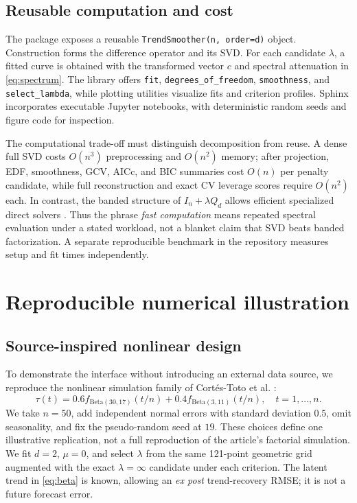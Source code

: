 \documentclass[pdflatex,sn-mathphys-ay]{sn-jnl}
\begin{document}


\subsection{Reusable computation and cost}
The package exposes a reusable \texttt{TrendSmoother(n, order=d)} object. Construction forms the difference operator and its SVD. For each candidate $\lambda$, a fitted curve is obtained with the transformed vector $c$ and spectral attenuation in \eqref{eq:spectrum}. The library offers \texttt{fit}, \texttt{degrees\_of\_freedom}, \texttt{smoothness}, and \texttt{select\_lambda}, while plotting utilities visualize fits and criterion profiles. Sphinx incorporates executable Jupyter notebooks, with deterministic random seeds and figure code for inspection.

The computational trade-off must distinguish decomposition from reuse. A dense full SVD costs $O(n^3)$ preprocessing and $O(n^2)$ memory; after projection, EDF, smoothness, GCV, AICc, and BIC summaries cost $O(n)$ per penalty candidate, while full reconstruction and exact CV leverage scores require $O(n^2)$ each. In contrast, the banded structure of $I_n+\lambda Q_d$ allows efficient specialized direct solvers \cite{weinert2007wh}. Thus the phrase \emph{fast computation} means repeated spectral evaluation under a stated workload, not a blanket claim that SVD beats banded factorization. A separate reproducible benchmark in the repository measures setup and fit times independently.



\section{Reproducible numerical illustration}
\subsection{Source-inspired nonlinear design}
To demonstrate the interface without introducing an external data source, we reproduce the nonlinear simulation family of Cort\'es-Toto et al. \cite{cortes2017smoothness}:
\begin{equation}\label{eq:beta}
 \tau(t)=0.6f_{\mathrm{Beta}(30,17)}(t/n)+0.4f_{\mathrm{Beta}(3,11)}(t/n),\quad t=1,\ldots,n.
\end{equation}
We take $n=50$, add independent normal errors with standard deviation $0.5$, omit seasonality, and fix the pseudo-random seed at $19$. These choices define one illustrative replication, not a full reproduction of the article's factorial simulation. We fit $d=2$, $\mu=0$, and select $\lambda$ from the same 121-point geometric grid augmented with the exact $\lambda=\infty$ candidate under each criterion. The latent trend in \eqref{eq:beta} is known, allowing an \emph{ex post} trend-recovery RMSE; it is not a future forecast error.
\end{document}
